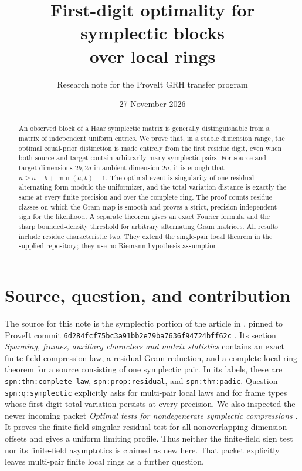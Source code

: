 \documentclass[11pt]{article}
\title{First-digit optimality for symplectic blocks\\over local rings}
\author{Research note for the ProveIt GRH transfer program}
\date{27 November 2026}
\theoremstyle{remark}
\begin{document}
\maketitle
\begin{abstract}
An observed block of a Haar symplectic matrix is generally distinguishable from a
matrix of independent uniform entries. We prove that, in a stable dimension
range, the optimal equal-prior distinction is made entirely from the first
residue digit, even when both source and target contain arbitrarily many
symplectic pairs. For source and target dimensions \(2b,2a\) in ambient
dimension \(2n\), it is enough that
\(n\ge a+b+\min(a,b)-1\). The optimal event is singularity of one residual
alternating form modulo the uniformizer, and the total variation distance is
exactly the same at every finite precision and over the complete ring. The
proof counts residue classes on which the Gram map is smooth and proves a
strict, precision-independent sign for the likelihood. A separate theorem gives
an exact Fourier formula and the sharp bounded-density threshold for arbitrary
alternating Gram matrices. All results include residue characteristic two.
They extend the single-pair local theorem in the supplied repository; they use
no Riemann-hypothesis assumption.
\end{abstract}

\section{Source, question, and contribution}

The source for this note is the symplectic portion of the article in
, pinned to ProveIt commit
\texttt{6d284fcf75bc3a91bb2e79ba7636f94724bff62c} \cite{ProveIt}.
Its section \emph{Spanning, frames, auxiliary characters and matrix statistics}
contains an exact finite-field compression law, a residual-Gram reduction,
and a complete local-ring theorem for a source consisting of one symplectic
pair. In its labels, these are \texttt{spn:thm:complete-law},
\texttt{spn:prop:residual}, and \texttt{spn:thm:padic}.
Question \texttt{spn:q:symplectic} explicitly asks for multi-pair local laws
and for frame types whose first-digit total variation persists at every
precision.
We also inspected the newer incoming packet
\emph{Optimal tests for nondegenerate symplectic compressions}
\cite{FiniteTests}. It proves the finite-field singular-residual test for
all nonoverlapping dimension offsets and gives a uniform limiting profile.
Thus neither the finite-field sign test nor its finite-field asymptotics
is claimed as new here. That packet explicitly leaves multi-pair finite
local rings as a further question.
\end{document}
